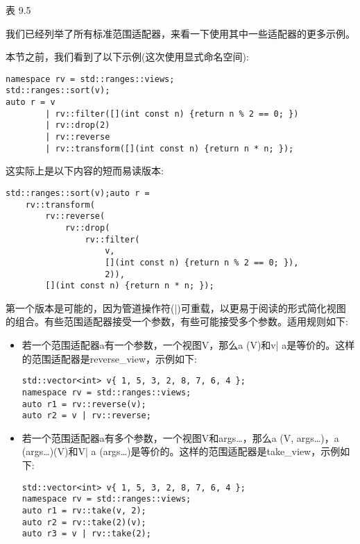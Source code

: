 \begin{center}
表 9.5
\end{center}

我们已经列举了所有标准范围适配器，来看一下使用其中一些适配器的更多示例。


本节之前，我们看到了以下示例(这次使用显式命名空间):

\begin{lstlisting}[style=styleCXX]
namespace rv = std::ranges::views;
std::ranges::sort(v);
auto r = v
		| rv::filter([](int const n) {return n % 2 == 0; })
		| rv::drop(2)
		| rv::reverse
		| rv::transform([](int const n) {return n * n; });
\end{lstlisting}

这实际上是以下内容的短而易读版本:

\begin{lstlisting}[style=styleCXX]
std::ranges::sort(v);auto r =
	rv::transform(
		rv::reverse(
			rv::drop(
				rv::filter(
					v,
					[](int const n) {return n % 2 == 0; }),
					2)),
		[](int const n) {return n * n; });
\end{lstlisting}

第一个版本是可能的，因为管道操作符(|)可重载，以更易于阅读的形式简化视图的组合。有些范围适配器接受一个参数，有些可能接受多个参数。适用规则如下:

\begin{itemize}
\item
若一个范围适配器a有一个参数，一个视图V，那么a (V)和v| a是等价的。这样的范围适配器是reverse\_view，示例如下:

\begin{lstlisting}[style=styleCXX]
std::vector<int> v{ 1, 5, 3, 2, 8, 7, 6, 4 };
namespace rv = std::ranges::views;
auto r1 = rv::reverse(v);
auto r2 = v | rv::reverse;
\end{lstlisting}

\item
若一个范围适配器a有多个参数，一个视图V和args…，那么a (V, args…)，a (args…)(V)和V| a (args…)是等价的。这样的范围适配器是take\_view，示例如下:

\begin{lstlisting}[style=styleCXX]
std::vector<int> v{ 1, 5, 3, 2, 8, 7, 6, 4 };
namespace rv = std::ranges::views;
auto r1 = rv::take(v, 2);
auto r2 = rv::take(2)(v);
auto r3 = v | rv::take(2);
\end{lstlisting}

\end{itemize}

